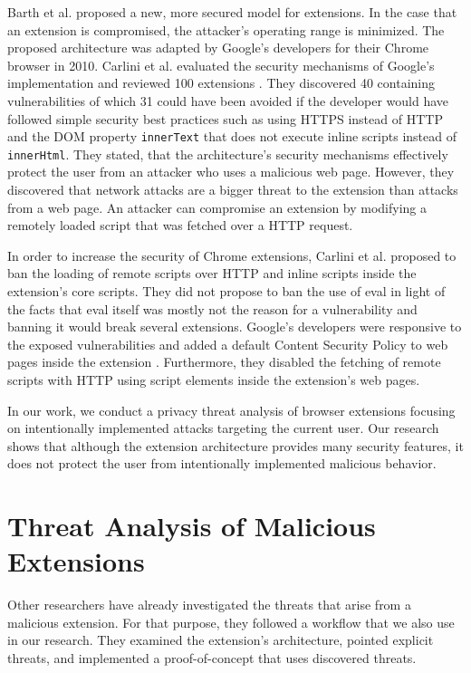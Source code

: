 	Barth et al. proposed a new, more secured model for extensions. In the case that an extension is compromised, the attacker's operating range is minimized. The proposed architecture was adapted by Google's developers for their Chrome browser in 2010. Carlini et al. evaluated the security mechanisms of Google's implementation and reviewed 100 extensions \cite{Carlini:2012:EGC:2362793.2362800}. They discovered 40 containing vulnerabilities of which 31 could have been avoided if the developer would have followed simple security best practices such as using HTTPS instead of HTTP and the DOM property \texttt{innerText} that does not execute inline scripts instead of \texttt{innerHtml}. They stated, that the architecture's security mechanisms effectively protect the user from an attacker who uses a malicious web page. However, they discovered that network attacks are a bigger threat to the extension than attacks from a web page. An attacker can compromise an extension by modifying a remotely loaded script that was fetched over a HTTP request. 
	
	In order to increase the security of Chrome extensions, Carlini et al. proposed to ban the loading of remote scripts over HTTP and inline scripts inside the extension's core scripts. They did not propose to ban the use of eval in light of the facts that eval itself was mostly not the reason for a vulnerability and banning it would break several extensions. Google's developers were responsive to the exposed vulnerabilities and added a default Content Security Policy to web pages inside the extension \cite{chromiumBlogCSP}. Furthermore, they disabled the fetching of remote scripts with HTTP using script elements inside the extension's web pages.
 
 	In our work, we conduct a privacy threat analysis of browser extensions focusing on intentionally implemented attacks targeting the current user. Our research shows that although the extension architecture provides many security features, it does not protect the user from intentionally implemented malicious behavior.
 
 \section{Threat Analysis of Malicious Extensions}
 \label{sec:relatedWorks:threatAnalysis}
 
	Other researchers have already investigated the threats that arise from a malicious extension. For that purpose, they followed a workflow that we also use in our research. They examined the extension's architecture, pointed explicit threats, and implemented a proof-of-concept that uses discovered threats.
 
